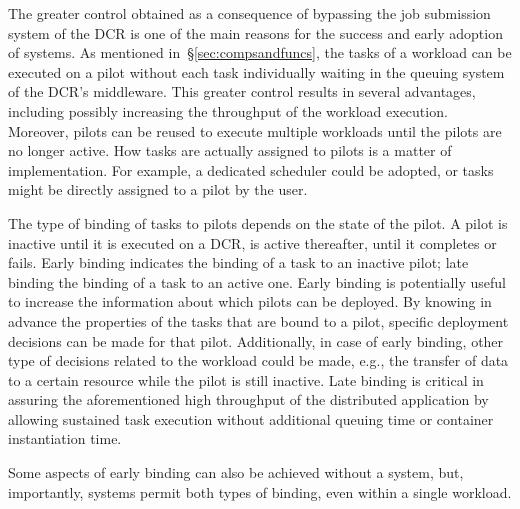 \documentclass{sig-alternate}
\begin{document}


The greater control obtained as a consequence of bypassing the job submission
system of the DCR is one of the main reasons for the success and early adoption
of \pilot systems.  As mentioned in~\S\ref{sec:compsandfuncs}, the tasks of a
workload can be executed on a pilot without each task individually waiting in
the queuing system of the DCR's middleware. This greater control results in
several advantages, including possibly increasing the throughput of the workload
execution. Moreover, pilots can be reused to execute multiple workloads until
the pilots are no longer active.  How tasks are actually assigned to pilots is
a matter of implementation. For example, a dedicated scheduler could be adopted,
or tasks might be directly assigned to a pilot by the user.

The type of binding of tasks to pilots depends on the state of the pilot. A
pilot is inactive until it is executed on a DCR, is active thereafter, until it
completes or fails.  Early binding indicates the binding of a task to an
inactive pilot; late binding the binding of a task to an active one. Early
binding is potentially useful to increase the information about which pilots
can be deployed. By knowing in advance the properties of the tasks that are
bound to a pilot, specific deployment decisions can be made for that pilot.
Additionally, in case of early binding, other type of decisions related to the
workload could be made, e.g., the transfer of data to a certain resource while
the pilot is still inactive. Late binding is critical in assuring the
aforementioned high throughput of the distributed application by allowing
sustained task execution without additional queuing time or container
instantiation time.

Some aspects of early binding can also be achieved without a \pilot system, but,
importantly, \pilot systems permit both types of binding, even within a single
workload. 

\end{document}
